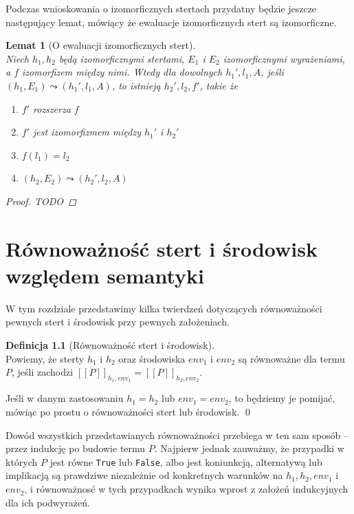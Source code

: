 \documentclass[]{pracamgr}
\renewcommand \| {\hspace{0.75em} | \hspace{0.75em} }
\renewcommand \[ {[\![}
\renewcommand \] {]\!]}
\newcommand \eval [1] {\overset{#1}{\leadsto}}
\newtheorem{lemma}{Lemat}
\theoremstyle{definition}
\newtheorem{definition}{Definicja}[section]
\begin{document}
Podczas wnioskowania o izomorficznych stertach przydatny będzie jeszcze następujący
lemat, mówiący że ewaluacje izomorficznych stert są izomorficzne.

\begin{lemma}[O ewaluacji izomorficznych stert] {\ } \\
\label{lem:iso_eval}
Niech $h_1, h_2$ będą izomorficznymi stertami, $E_1$ i $E_2$ izomorficznymi wyrażeniami,
a $f$ izomorfizem między nimi.
Wtedy dla dowolnych $h_1', l_1, A$, jeśli $(h_1, E_1) \eval{} (h_1', l_1, A)$, to
istnieją $h_2', l_2, f'$, takie że
\begin{enumerate}
 \item $f'$ rozszerza $f$
 \item $f'$ jest izomorfizmem między $h_1'$ i $h_2'$
 \item $f(l_1) = l_2$
 \item $(h_2, E_2) \eval{} (h_2', l_2, A)$
\end{enumerate}
\begin{proof}
TODO
\end{proof}
\end{lemma}

\chapter{Równoważność stert i środowisk względem semantyki}
\label{chap:equiv}
W tym rozdziale przedstawimy kilka twierdzeń dotyczących równoważności pewnych stert i środowisk
przy pewnych założeniach.

\begin{definition}[Równoważność stert i środowisk] {\ } \\
Powiemy, że sterty $h_1$ i $h_2$ oraz środowiska $env_1$ i $env_2$ są równoważne dla termu $P$, jeśli
zachodzi $\[ P \]_{h_1, env_1} = \[ P \]_{h_2, env_2}$.

Jeśli w danym zastosowaniu $h_1 = h_2$ lub $env_1 = env_2$, to będziemy je pomijać,
mówiąc po prostu o równoważności stert lub środowisk.
\qed
\end{definition}

Dowód wszystkich przedstawianych równoważności przebiega w ten sam sposób -- przez indukcję
po budowie termu $P$. Najpierw jednak zauważmy, że przypadki w których $P$ jest równe 
\texttt{True} lub \texttt{False}, albo jest koniunkcją, alternatywą lub implikacją
są prawdziwe niezależnie od konkretnych warunków na $h_1, h_2, env_1$ i $env_2$, i
równoważnosć w tych przypadkach wynika wprost
z założeń indukcyjnych dla ich podwyrażeń.
\end{document}

